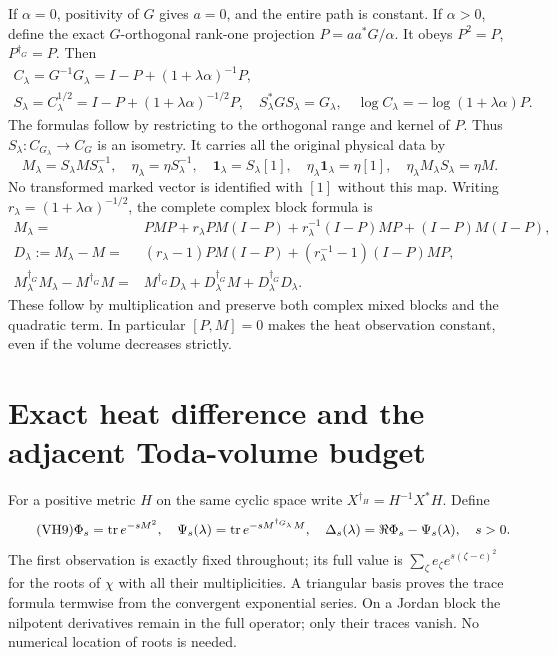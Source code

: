 If \(\alpha=0\), positivity of \(G\) gives \(a=0\), and the entire
path is constant. If \(\alpha>0\), define the exact \(G\)-orthogonal
rank-one projection
\(P=aa^*G/\alpha\). It obeys \(P^2=P\), \(P^{\dagger_G}=P\).
Then
\begin{equation}\tag{VH6}\label{hvh:VH6}
\begin{gathered}
C_\lambda=G^{-1}G_\lambda=I-P+(1+\lambda\alpha)^{-1}P,\\
S_\lambda=C_\lambda^{1/2}=I-P+(1+\lambda\alpha)^{-1/2}P,\quad
S_\lambda^*GS_\lambda=G_\lambda,\quad
\log C_\lambda=-\log(1+\lambda\alpha)P.
\end{gathered}
\end{equation}
The formulas follow by restricting to the orthogonal range and kernel
of \(P\). Thus \(S_\lambda:C_{G_\lambda}\to C_G\) is an isometry.
It carries all the original physical data by
\begin{equation}\tag{VH7}\label{hvh:VH7}
M_\lambda=S_\lambda MS_\lambda^{-1},\quad
\eta_\lambda=\eta S_\lambda^{-1},\quad
\mathbf1_\lambda=S_\lambda[1],\quad
\eta_\lambda\mathbf1_\lambda=\eta[1],\quad
\eta_\lambda M_\lambda S_\lambda=\eta M.
\end{equation}
No transformed marked vector is identified with \([1]\) without this
map. Writing \(r_\lambda=(1+\lambda\alpha)^{-1/2}\), the complete
complex block formula is
\begin{equation}\tag{VH8}\label{hvh:VH8}
\begin{split}
M_\lambda={}&PMP+r_\lambda PM(I-P)
+r_\lambda^{-1}(I-P)MP+(I-P)M(I-P),\\
D_\lambda:=M_\lambda-M={}&(r_\lambda-1)PM(I-P)
+(r_\lambda^{-1}-1)(I-P)MP,\\
M_\lambda^{\dagger_G}M_\lambda-M^{\dagger_G}M
={}&M^{\dagger_G}D_\lambda+D_\lambda^{\dagger_G}M
+D_\lambda^{\dagger_G}D_\lambda.
\end{split}
\end{equation}
These follow by multiplication and preserve both complex mixed blocks
and the quadratic term. In particular \([P,M]=0\) makes the heat
observation constant, even if the volume decreases strictly.

\section{Exact heat difference and the adjacent Toda-volume budget}

For a positive metric \(H\) on the same cyclic space write
\(X^{\dagger_H}=H^{-1}X^*H\). Define
\begin{equation}\tag{VH9}\label{hvh:VH9}
\Phi_s=\operatorname{tr} e^{-sM^2},\quad
\Psi_s(\lambda)=\operatorname{tr} e^{-sM^{\dagger_{G_\lambda}}M},\quad
\Delta_s(\lambda)=\Re\Phi_s-\Psi_s(\lambda),\quad s>0.
\end{equation}
The first observation is exactly fixed throughout; its full value is
\(\sum_\zeta e_\zeta e^{s(\zeta-c)^2}\) for the roots of \(\chi\)
with all their multiplicities. A triangular basis proves the trace
formula termwise from the convergent exponential series. On a Jordan
block the nilpotent derivatives remain in the full operator; only
their traces vanish. No numerical location of roots is needed.


